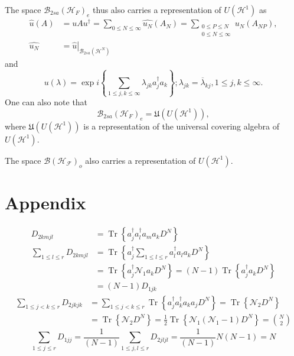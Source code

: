 \documentclass[aps,preprint]{revtex4}%
\begin{document}
The space $\mathcal{B}_{2sa}\left(  \mathcal{H}_{F}\right)  _{e}$ thus also
carries a representation of $U\left(  \mathcal{H}^{1}\right)  $ as
\begin{align}
\widehat{u}(A)  &  =uAu^{\dagger}=\sum_{0\leq N\leq\infty}\widehat{u_{N}%
}\left(  A_{N}\right)  =\sum_{\substack{0\leq P\leq N\\0\leq N\leq\infty
}}\widehat{u_{N}}\left(  A_{NP}\right)  ,\\
\widehat{u_{N}}  &  =\left.  \widehat{u}\right\vert _{\mathcal{B}_{2sa}\left(
\mathcal{H}^{N}\right)  }%
\end{align}
and
\begin{equation}
u\left(  \lambda\right)  =\exp i\left\{  \sum_{1\leq j,k\leq\infty}%
\lambda_{jk}a_{j}^{\dagger}a_{k}\right\}  ;\lambda_{jk}=\overline{\lambda
}_{kj},1\leq j,k\leq\infty.
\end{equation}
One can also note that
\begin{equation}
\mathcal{B}_{2sa}\left(  \mathcal{H}_{F}\right)  _{e}=\mathfrak{U}\left(
U\left(  \mathcal{H}^{1}\right)  \right)  ,
\end{equation}
where $\mathfrak{U}\left(  U\left(  \mathcal{H}^{1}\right)  \right)  $ is a
representation of the universal covering algebra of $U\left(  \mathcal{H}%
^{1}\right)  .$

The space $\mathcal{B}\left(  \mathcal{H}_{\mathcal{F}}\right)  _{o}$ also
carries a representation of $U\left(  \mathcal{H}^{1}\right)  .$

\section{Appendix}%

\begin{align}
D_{2kmjl}  &  =\operatorname{Tr}\left\{  a_{j}^{\dagger}a_{l}^{\dagger}%
a_{m}a_{k}D^{N}\right\} \\
\sum_{1\leq l\leq r}D_{2kmjl}  &  =\operatorname{Tr}\left\{  a_{j}^{\dagger
}\sum_{1\leq l\leq r}a_{l}^{\dagger}a_{l}a_{k}D^{N}\right\} \\
&  =\operatorname{Tr}\left\{  a_{j}^{\dagger}\mathcal{N}_{1}a_{k}%
D^{N}\right\}  =\left(  N-1\right)  \operatorname{Tr}\left\{  a_{j}^{\dagger
}a_{k}D^{N}\right\} \\
&  =\left(  N-1\right)  D_{1jk}%
\end{align}%
\begin{align*}
\sum_{1\leq j<k\leq r}D_{2jkjk}  &  =\sum_{1\leq j<k\leq r}\operatorname{Tr}%
\left\{  a_{j}^{\dagger}a_{k}^{\dagger}a_{k}a_{j}D^{N}\right\}
=\operatorname{Tr}\left\{  \mathcal{N}_{2}D^{N}\right\} \\
&  =\operatorname{Tr}\left\{  \mathcal{N}_{2}D^{N}\right\}  =\frac{1}%
{2}\operatorname{Tr}\left\{  \mathcal{N}_{1}\left(  \mathcal{N}_{1}-1\right)
D^{N}\right\}  =\binom{N}{2}%
\end{align*}%
\begin{equation}
\sum_{1\leq j\leq r}D_{1jj}=\frac{1}{\left(  N-1\right)  }\sum_{1\leq j,l\leq
r}D_{2jljl}=\frac{1}{\left(  N-1\right)  }N\left(  N-1\right)  =N
\end{equation}
\end{document}
